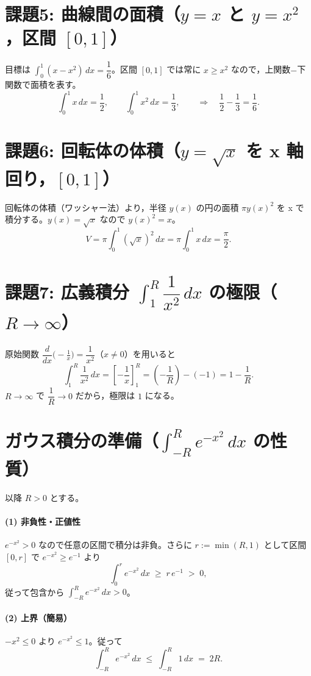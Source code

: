 \documentclass[a4paper,12pt]{article}
\begin{document}
\section{課題5: 曲線間の面積（$y=x$ と $y=x^2$，区間 $[0,1]$）}
目標は $\int_0^1 (x - x^2)\,dx = \dfrac{1}{6}$。区間 $[0,1]$ では常に $x \ge x^2$ なので，上関数$-$下関数で面積を表す。
\[
  \int_0^1 x\,dx = \frac{1}{2},\qquad \int_0^1 x^2\,dx = \frac{1}{3},\qquad \Rightarrow\quad \frac{1}{2} - \frac{1}{3} = \frac{1}{6}.
\]

\section{課題6: 回転体の体積（$y=\sqrt{x}$ を x 軸回り，$[0,1]$）}
回転体の体積（ワッシャー法）より，半径 $y(x)$ の円の面積 $\pi y(x)^2$ を x で積分する。$y(x)=\sqrt{x}$ なので $y(x)^2 = x$。
\[
  V = \pi \int_0^1 (\sqrt{x})^2\,dx = \pi \int_0^1 x\,dx = \frac{\pi}{2}.
\]

\section{課題7: 広義積分 $\int_1^R \dfrac{1}{x^2}\,dx$ の極限（$R\to\infty$）}
原始関数 $\dfrac{d}{dx}\bigl(-\tfrac{1}{x}\bigr) = \dfrac{1}{x^2}$（$x\ne 0$）を用いると
\[
  \int_1^R \frac{1}{x^2}\,dx = \left[-\frac{1}{x}\right]_1^R = \left(-\frac{1}{R}\right) - \left(-1\right) = 1 - \frac{1}{R}.
\]
$R\to\infty$ で $\dfrac{1}{R}\to 0$ だから，極限は $1$ になる。

\section{ガウス積分の準備（$\int_{-R}^{R} e^{-x^2}\,dx$ の性質）}
以降 $R>0$ とする。

\paragraph{(1) 非負性・正値性} $e^{-x^2}>0$ なので任意の区間で積分は非負。さらに $r:=\min(R,1)$ として区間 $[0,r]$ で $e^{-x^2}\ge e^{-1}$ より
\[
  \int_0^r e^{-x^2}\,dx \;\ge\; r\,e^{-1} \;>\; 0,
\]
従って包含から $\int_{-R}^{R} e^{-x^2}\,dx>0$。

\paragraph{(2) 上界（簡易）} $-x^2\le 0$ より $e^{-x^2}\le 1$。従って
\[
  \int_{-R}^{R} e^{-x^2}\,dx \;\le\; \int_{-R}^{R} 1\,dx \;=\; 2R.
\]
\end{document}

